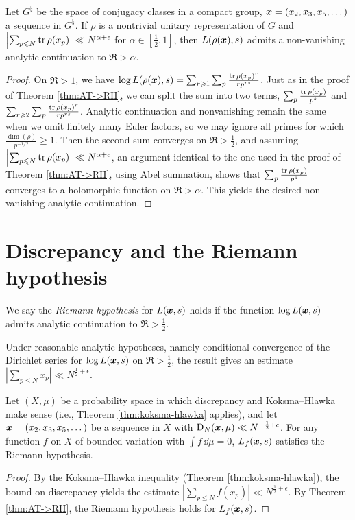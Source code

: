 \begin{theorem}\label{thm:AT->RH:gp}
Let $G^\natural$ be the space of conjugacy classes in a compact group, 
${\boldsymbol x} = (x_2,x_3,x_5,\dots)$ a sequence in $G^\natural$. If $\rho$ is a 
nontrivial unitary representation of $G$ and 
$\left| \sum_{p\leqslant N} \operatorname{tr} \rho(x_p)\right| \ll N^{\alpha+\epsilon}$ for 
$\alpha\in \left[\frac 1 2,1\right]$, then $L(\rho({\boldsymbol x}),s)$ admits a 
non-vanishing analytic continuation to $\Re > \alpha$. 
\end{theorem}
\begin{proof}
On $\Re > 1$, we have 
$\log L(\rho({\boldsymbol x}),s) = \sum_{r\geqslant 1} \sum_p \frac{\operatorname{tr} \rho(x_p)^r}{r p^{r s}}$. 
Just as in the proof of Theorem \ref{thm:AT->RH}, we can split the sum into 
two terms, $\sum_p \frac{\operatorname{tr} \rho(x_p)}{p^s}$ and 
$\sum_{r\geqslant 2} \sum_p \frac{\operatorname{tr} \rho(x_p)^r}{r p^{r s}}$. Analytic 
continuation and nonvanishing remain the same when we omit finitely many Euler 
factors, so we may ignore all primes for which 
$\frac{\dim(\rho)}{p^{-1/2}} \geqslant 1$. Then the second sum converges on 
$\Re > \frac 1 2$, and assuming 
$\left| \sum_{p\leqslant N} \operatorname{tr} \rho(x_p)\right| \ll N^{\alpha+\epsilon}$, an 
argument identical to the one used in the proof of Theorem \ref{thm:AT->RH}, 
using Abel summation, shows that 
$\sum_p \frac{\operatorname{tr} \rho(x_p)}{p^s}$ converges to a holomorphic function on 
$\Re > \alpha$. This yields the desired non-vanishing analytic continuation. 
\end{proof}





\section{Discrepancy and the Riemann hypothesis}

\begin{definition}
We say the \emph{Riemann hypothesis} for $L({\boldsymbol x},s)$ holds if the function 
$\log L({\boldsymbol x},s)$ admits analytic continuation to $\Re > \frac 1 2$. 
\end{definition}

Under reasonable analytic hypotheses, namely conditional convergence of 
the Dirichlet series for 
$\log L({\boldsymbol x},s)$ on $\Re > \frac 1 2$, the result 
\cite[II.1 Th.~10]{tenenbaum-1995} gives 
an estimate $|\sum_{p\leqslant N} x_p| \ll N^{\frac 1 2 + \epsilon}$. 

\begin{theorem}
Let $(X,\mu)$ be a probability space in which discrepancy and Koksma--Hlawka 
make sense (i.e., Theorem \ref{thm:koksma-hlawka} applies), and let 
${\boldsymbol x}=(x_2,x_3,x_5,\dots)$ be a sequence in $X$ with 
$\operatorname{D}_N({\boldsymbol x},\mu) \ll N^{-\frac 1 2+\epsilon}$. For any function $f$ on $X$ of 
bounded variation with $\int f\, \dd\mu = 0$, $L_f({\boldsymbol x},s)$ satisfies 
the Riemann hypothesis. 
\end{theorem}
\begin{proof}
By the Koksma--Hlawka inequality (Theorem \ref{thm:koksma-hlawka}), the bound 
on discrepancy yields the estimate 
$\left| \sum_{p\leqslant N} f(x_p)\right| \ll N^{\frac 1 2+\epsilon}$. 
By Theorem \ref{thm:AT->RH}, the Riemann hypothesis holds for $L_f({\boldsymbol x},s)$. 
\end{proof}

